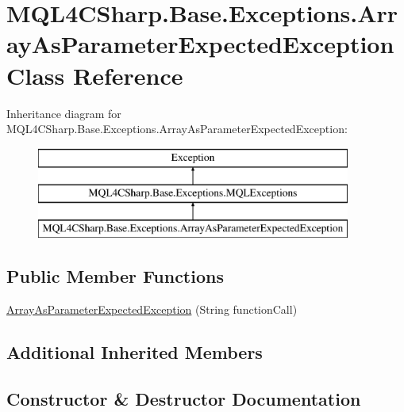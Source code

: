 \hypertarget{class_m_q_l4_c_sharp_1_1_base_1_1_exceptions_1_1_array_as_parameter_expected_exception}{}\section{M\+Q\+L4\+C\+Sharp.\+Base.\+Exceptions.\+Array\+As\+Parameter\+Expected\+Exception Class Reference}
\label{class_m_q_l4_c_sharp_1_1_base_1_1_exceptions_1_1_array_as_parameter_expected_exception}
Inheritance diagram for M\+Q\+L4\+C\+Sharp.\+Base.\+Exceptions.\+Array\+As\+Parameter\+Expected\+Exception\+:\begin{figure}[H]
\begin{center}
\leavevmode
\includegraphics[height=3.000000cm]{class_m_q_l4_c_sharp_1_1_base_1_1_exceptions_1_1_array_as_parameter_expected_exception}
\end{center}
\end{figure}
\subsection*{Public Member Functions}
\begin{DoxyCompactItemize}
\item 
\hyperlink{class_m_q_l4_c_sharp_1_1_base_1_1_exceptions_1_1_array_as_parameter_expected_exception_a83d71a838c3d76566f1f4543e9caccba}{Array\+As\+Parameter\+Expected\+Exception} (String function\+Call)
\end{DoxyCompactItemize}
\subsection*{Additional Inherited Members}


\subsection{Constructor \& Destructor Documentation}
